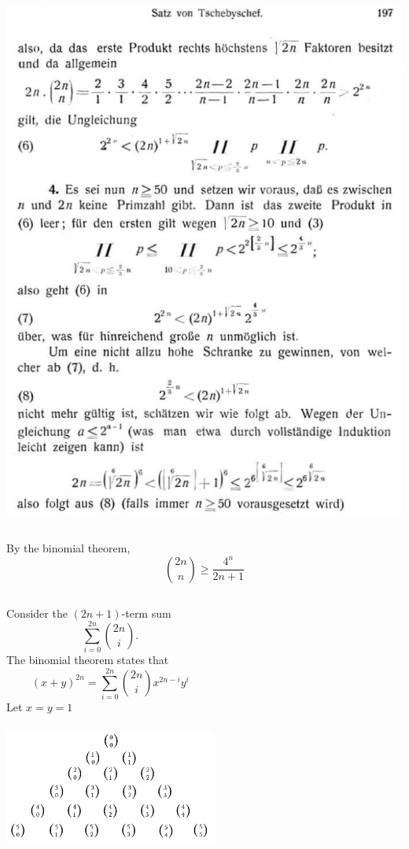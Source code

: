 \documentclass{beamer}
\begin{document}
\begin{frame}
\begin{columns}[onlytextwidth,T]
\begin{center}
\includegraphics[scale = .22]{proof_german2}
\end{center}
\end{columns}
\end{frame}

\begin{frame}
\begin{lemma}[1]
\normalfont By the binomial theorem,
$${2n \choose n}  \geq \frac{4^n}{2n + 1}$$
 \end{lemma}
\pause
\begin{columns}[onlytextwidth,T]
\column{\dimexpr\linewidth-60mm-5mm} Consider the $(2n+1)$-term sum
 $$\sum_{i=0}^{2n} {2n \choose i}.$$
 \pause
The binomial theorem states that
$$(x + y)^{2n} = \sum_{i=0}^{2n} {2n \choose i} x^{2n - i}y^i$$
Let $x = y = 1$
\column{\dimexpr\linewidth-10mm-0mm} \ \\ \ \\  \includegraphics[width=70mm]{pascal2}
\end{columns}
\end{frame}
\end{document}
